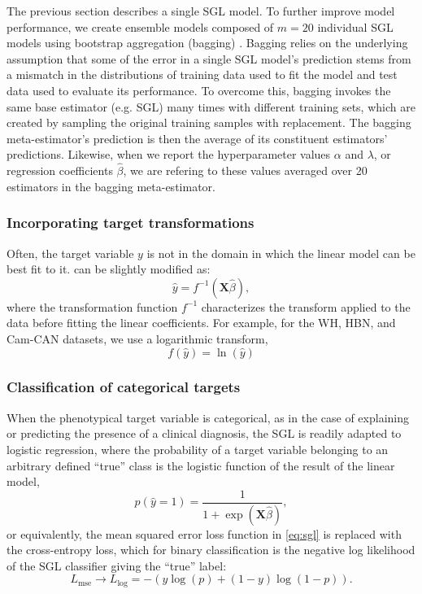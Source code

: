 \documentclass[10pt,%
               aps,%
               prl,%
               preprint,%
               superscriptaddress,%
               preprintnumbers,%
               amsmath,%
               floatfix,%
               endfloats*]{revtex4-2}
\begin{document}
The previous section describes a single SGL model. To further improve model
performance, we create ensemble models composed of $m = 20$ individual SGL
models using bootstrap aggregation (bagging) \cite{breiman1996bagging}.
Bagging relies on the underlying assumption that some of the error in a
single SGL model's prediction stems from a mismatch in the distributions of
training data used to fit the model and test data used to evaluate its
performance. To overcome this, bagging invokes the same base estimator (e.g.
SGL) many times with different training sets, which are created by sampling
the original training samples with replacement. The bagging meta-estimator's
prediction is then the average of its constituent estimators' predictions.
Likewise, when we report the hyperparameter values $\alpha$ and $\lambda$, or
regression coefficients $\hat{\beta}$, we are refering to these values
averaged over 20 estimators in the bagging meta-estimator.

\subsubsection{Incorporating target transformations}

Often, the target variable $y$ is not in the domain in which the linear
model can be best fit to it.  can be slightly
modified as:
\begin{equation}
    \hat{y} = f^{-1} \left( \mathbf{X} \hat{\beta} \right),
    \label{eq:lm-transform}
\end{equation}
where the transformation function $f^{-1}$ characterizes the transform
applied to the data before fitting the linear coefficients. For example,
for the WH, HBN, and Cam-CAN datasets, we use a logarithmic transform,
\begin{equation}
    f \left( \hat{y} \right) = \ln \left( \hat{y} \right)
    \label{eq:log-nonlinearity}
\end{equation}

\subsubsection{Classification of categorical targets}
When the phenotypical target variable is categorical, as in the case of
explaining or predicting the presence of a clinical diagnosis, the SGL is
readily adapted to logistic regression, where the probability of a target
variable belonging to an arbitrary defined ``true'' class is the logistic
function of the result of the linear model,
\begin{equation}
    p(\hat{y} = 1) = \frac{1}{1 + \exp(\mathbf{X} \hat{\beta})},
    \label{eq:logit}
\end{equation}
or equivalently, the mean squared error loss function in \cref{eq:sgl} is
replaced with the cross-entropy loss, which for binary classification is the
negative log likelihood of the SGL classifier giving the ``true'' label:
\begin{equation}
    L_{\text{mse}} \rightarrow L_{\log} =
    -\left(y \log(p) + (1 - y) \log(1 - p)\right).
    \label{eq:logloss}
\end{equation}
\end{document}
